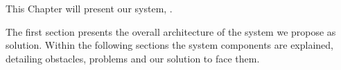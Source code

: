 
\chapter{\TheName}
\label{chapter:\TheName}
This Chapter will present our system, \TheName. 

The first section presents the overall architecture of the system we propose as solution. Within the following sections the system components are explained, detailing obstacles, problems and our solution to face them.




